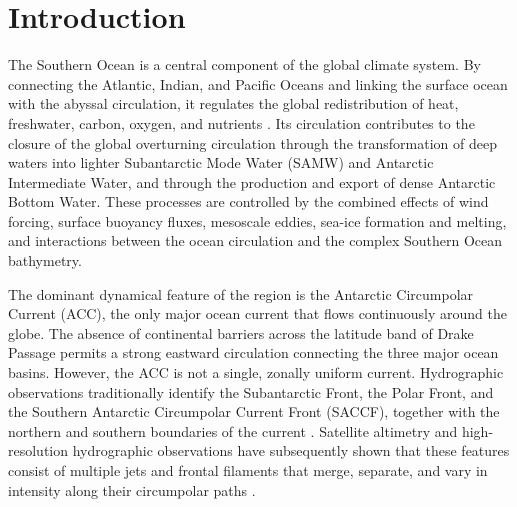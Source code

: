 \documentclass[
  draft
]{agujournal2025}
\begin{document}
\begin{abstract}
    Abstract text body with some more content.
     \begin{plainlanguagesummary}
These balconies with these geraniums, this Testaccio this San Lorenzo, pieces of Rome looking at me, with this sauce with the bricks. A housewife with her parannanza comes to me with the bricks, and these pieces of Rome, this perfume, with these geraniums. Pieces of Rome walking around, pieces of Rome, pieces of Rome looking at me. A housewife with her parannanza comes to me with the bricks, and these pieces of Rome, this perfume, with these geraniums... 
No, don't walk away ... stay with us with this lasagna filled of quails, these strifinzoli imporchettati, with this lamb filled of ricotta, filled of artichokes alla giud\'ia...
     \end{plainlanguagesummary}
\end{abstract}


\section{Introduction}
    \label{sec:introduction}

    The Southern Ocean is a central component of the global climate system. By connecting the Atlantic, Indian, and Pacific Oceans and linking the surface ocean with the abyssal circulation, it regulates the global redistribution of heat, freshwater, carbon, oxygen, and nutrients \cite{art:rintoul2018,art:bennetts2024}. Its circulation contributes to the closure of the global overturning circulation through the transformation of deep waters into lighter Subantarctic Mode Water (SAMW) and Antarctic Intermediate Water, and through the production and export of dense Antarctic Bottom Water. These processes are controlled by the combined effects of wind forcing, surface buoyancy fluxes, mesoscale eddies, sea-ice formation and melting, and interactions between the ocean circulation and the complex Southern Ocean bathymetry.
    
    The dominant dynamical feature of the region is the Antarctic Circumpolar Current (ACC), the only major ocean current that flows continuously around the globe. The absence of continental barriers across the latitude band of Drake Passage permits a strong eastward circulation connecting the three major ocean basins. However, the ACC is not a single, zonally uniform current. Hydrographic observations traditionally identify the Subantarctic Front, the Polar Front, and the Southern Antarctic Circumpolar Current Front (SACCF), together with the northern and southern boundaries of the current \cite{art:orsi1995,art:belkin1996}. Satellite altimetry and high-resolution hydrographic observations have subsequently shown that these features consist of multiple jets and frontal filaments that merge, separate, and vary in intensity along their circumpolar paths \cite{art:sokolov2009}.
\end{document}

